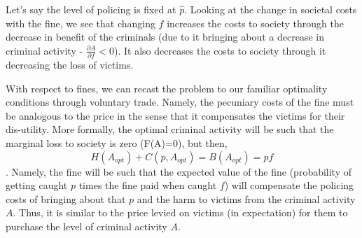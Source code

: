\documentclass[12pt]{paper}
\begin{document}
Let's say the level of policing is fixed at $\hat{p}$. Looking at the
change in societal costs with the fine, we see that changing $f$
increases the costs to society through the decrease in benefit of the
criminals (due to it bringing about a decrease in criminal activity -
$\frac{\partial{A}}{\partial{f}}<0$). It also decreases the costs to society through
it decreasing the loss of victims. \par
With respect to fines, we can recast the problem to our familiar
optimality conditions through voluntary trade. Namely, the pecuniary
costs of the fine must be analogous to the price in the sense that it
compensates the victims for their dis-utility. More formally, the
optimal criminal activity will be such that the marginal loss to
society is zero (F(A)=0), but then,
$$ H(A_{opt}) + C(p,A_{opt}) = B(A_{opt}) = p f$$. Namely, the fine
will be such that the expected value of the fine (probability of
getting caught $p$ times the fine paid when caught $f$) will
compensate the policing costs of bringing about that $p$ and the harm
to victims from the criminal activity $A$. Thus, it is similar to the
price levied on victims (in expectation) for them to purchase the
level of criminal activity $A$.  \pagebreak
\end{document}
